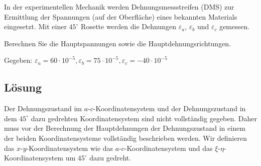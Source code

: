 \documentclass{exercise}
\begin{document}
    \begin{problem}
        In der experimentellen Mechanik werden Dehnungsmessstreifen (DMS) zur Ermittlung der Spannungen (auf der Oberfläche) eines bekannten Materials eingesetzt.
        Mit einer \(45^\circ\) Rosette werden die Dehnungen \(\varepsilon_a\), \(\varepsilon_b\) und \(\varepsilon_c\) gemessen.
        \begin{center}
        \end{center}
        Berechnen Sie die Hauptspannungen sowie die Hauptdehnungsrichtungen.

        Gegeben: \(\varepsilon_a = 60 \cdot 10^{-5}, \varepsilon_b = 75 \cdot 10^{-5}, \varepsilon_c = -40 \cdot 10^{-5}\)
    \end{problem}

    \subsection*{Lösung}
    Der Dehnungszustand im \(a\)-\(c\)-Koordinatensystem und der Dehnungszustand in dem \(45^\circ\) dazu gedrehten Koordinatensystem sind nicht vollständig gegeben.
    Daher muss vor der Berechnung der Hauptdehnungen der Dehnungszustand in einem der beiden Koordinatensysteme vollständig beschrieben werden.
    Wir definieren das \(x\)-\(y\)-Koordinatensystem wie das \(a\)-\(c\)-Koordinatensystem und das \(\xi\)-\(\eta\)-Koordinatensystem um \(45^\circ\) dazu gedreht.
\end{document}
